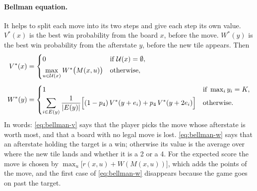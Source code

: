 \documentclass[11pt,a4paper]{article}
\theoremstyle{remark}
\newcommand{\U}{\mathcal{U}}
\begin{document}
\paragraph{Bellman equation.} It helps to split each move into its two steps and give each step its own value. $V^*(x)$ is the best win probability from the board $x$, before the move. $W^*(y)$ is the best win probability from the afterstate $y$, before the new tile appears. Then
\begin{align}
V^*(x) &=
\begin{cases}
0 & \text{if } \U(x)=\emptyset,\\[2pt]
\max\limits_{u\in\U(x)} W^*\bigl(M(x,u)\bigr) & \text{otherwise},
\end{cases}
\label{eq:bellman-v}\\[4pt]
W^*(y) &=
\begin{cases}
1 & \text{if } \max_i y_i = K,\\[2pt]
\displaystyle\sum_{i\in E(y)} \frac{1}{|E(y)|}\Bigl[(1-p_4)\,V^*(y+e_i)+p_4\,V^*(y+2e_i)\Bigr] & \text{otherwise}.
\end{cases}
\label{eq:bellman-w}
\end{align}
In words: \eqref{eq:bellman-v} says that the player picks the move whose afterstate is worth most, and that a board with no legal move is lost. \eqref{eq:bellman-w} says that an afterstate holding the target is a win; otherwise its value is the average over where the new tile lands and whether it is a 2 or a 4. For the expected score the move is chosen by $\max_{u}\bigl[r(x,u)+W(M(x,u))\bigr]$, which adds the points of the move, and the first case of \eqref{eq:bellman-w} disappears because the game goes on past the target.
\end{document}

